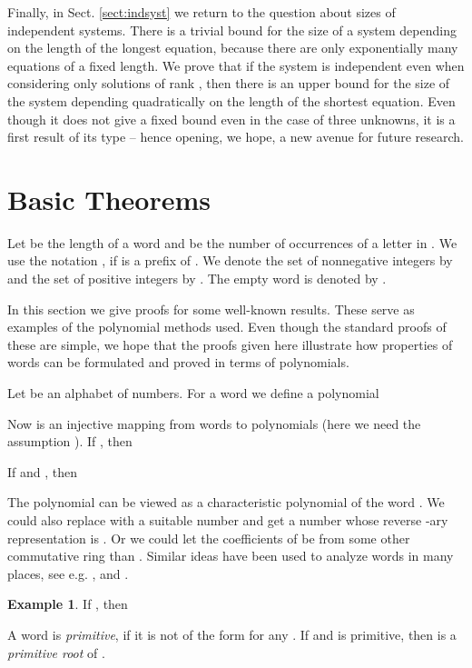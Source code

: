 \documentclass[submission]{eptcs}
\theoremstyle{definition}
\newtheorem{example}[theorem]{Example}
\begin{document}
Finally, in Sect. \ref{sect:indsyst} we return to the question about
sizes of independent systems. There is a trivial bound for the size
of a system depending on the length of the longest equation, because
there are only exponentially many equations of a fixed length. We
prove that if the system is independent even when considering only
solutions of rank , then there is an upper bound for the size
of the system depending quadratically on the length of the shortest
equation. Even though it does not give a fixed bound even in the
case of three unknowns, it is a first result of its type -- hence
opening, we hope, a new avenue for future research.

\section{Basic Theorems} \label{sect:basic}

Let  be the length of a word  and  be the number of
occurrences of a letter  in . We use the notation ,
if  is a prefix of . We denote the set of nonnegative integers
by  and the set of positive integers by . The empty word
is denoted by .

In this section we give proofs for some well-known results. These
serve as examples of the polynomial methods used. Even though the
standard proofs of these are simple, we hope that the proofs given
here illustrate how properties of words can be formulated and proved
in terms of polynomials.

Let  be an alphabet of numbers. For a word  we define a polynomial

Now  is an injective mapping from words to
polynomials (here we need the assumption ). If
, then

If  and , then


The polynomial  can be viewed as a characteristic polynomial
of the word . We could also replace  with a suitable number
 and get a number whose reverse -ary representation is . Or
we could let the coefficients of  be from some other
commutative ring than . Similar ideas have been used to analyze
words in many places, see e.g. \cite{Ku97}, \cite{Sa85} and
\cite{HoKo09}.

\begin{example}
If , then

\end{example}

A word  is \emph{primitive}, if it is not of the form  for
any . If  and  is primitive, then  is a
\emph{primitive root} of .
\end{document}
